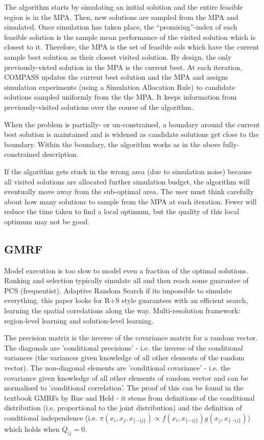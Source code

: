 \documentclass{article}
\begin{document}
The algorithm starts by simulating an initial solution and the entire feasible region is in the MPA. Then, new solutions are sampled from the MPA and simulated. Once simulation has taken place, the ``promising''-index of each feasible solution is the sample mean performance of the visited solution which is closest to it. Therefore, the MPA is the set of feasible sols which have the current sample best solution as their closest visited solution. By design, the only previously-visted solution in the MPA is the current best. At each iteration, COMPASS updates the current best solution and the MPA and assigns simulation experiments (using a Simulation Allocation Rule) to candidate solutions sampled uniformly from the the MPA. It keeps information from previously-visited solutions over the course of the algorithm.   \newline

When the problem is partially- or un-constrained, a boundary around the current best solution is maintained and is widened as candidate solutions get close to the boundary. Within the boundary, the algorithm works as in the above fully-constrained description. \newline

If the algorithm gets stuck in the wrong area (due to simulation noise) because all visited solutions are allocated further simulation budget, the algorithm will eventually move away from the sub-optimal area. The user must think carefully about how many solutions to sample from the MPA at each iteration. Fewer will reduce the time taken to find a local optimum, but the quality of this local optimum may not be good. 

\subsection{GMRF}

Model execution is too slow to model even a fraction of the optimal solutions. Ranking and selection typically simulate all and then reach some guarantee of PCS (frequentist). Adaptive Random Search if its impossible to simulate everything. this paper looks for R+S style guarantees with an efficient search, learning the spatial correlations along the way. Multi-resolution framework: region-level learning and solution-level learning. \newline

The precision matrix is the inverse of the covariance matrix for a random vector. The diagonals are 'conditional precisions' - i.e. the inverse of the conditional variances (the variances given knowledge of all other elements of the random vector). The non-diagonal elements are 'conditional covariance' - i.e. the covariance given knowledge of all other elements of random vector and can be normalised to 'conditional correlation'. The proof of this can be found in the textbook GMRFs by Rue and Held - it stems from definitions of the conditional distribution (i.e. proportional to the joint distribution) and the definition of conditional independence (i.e. $\pi(x_i,x_j,x_{\{-ij\}}) \propto f(x_i,x_{\{-ij\}})g(x_j,x_{\{-ij\}})$) which holds when $Q_{ij}=0$. \newline
\end{document}
